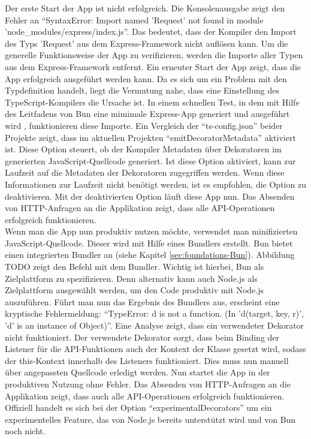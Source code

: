 \noindent
Der erste Start der App ist nicht erfolgreich. Die Konsolenausgabe zeigt den Fehler an ``SyntaxError: Import named 'Request' not found in module 'node\_modules/express/index.js''. Das bedeutet, dass der Kompiler den Import des Typs 'Request' aus dem Express-Framework nicht auflösen kann. Um die generelle Funktionsweise der App zu verifizieren, werden die Importe aller Typen aus dem Express-Framework entfernt. Ein erneuter Start der App zeigt, dass die App erfolgreich ausgeführt werden kann. Da es sich um ein Problem mit den Typdefinition handelt, liegt die Vermutung nahe, dass eine Einstellung des TypeScript-Kompilers  die Ursache ist. In einem schnellen Test, in dem mit Hilfe des Leitfadens von Bun eine mimimale Express-App generiert und ausgeführt wird , funktionieren diese Importe. Ein Vergleich der ``ts-config.json'' beider Projekte zeigt, dass im aktuellen Projekten ``emitDecoratorMetadata'' aktiviert ist. Diese Option steuert, ob der Kompiler Metadaten über Dekoratoren im generierten JavaScript-Quellcode generiert. Ist diese Option aktiviert, kann zur Laufzeit auf die Metadaten der Dekoratoren zugegriffen werden. Wenn diese Informationen zur Laufzeit nicht benötigt werden, ist es empfohlen, die Option zu deaktivieren. Mit der deaktivierten Option läuft diese App nun. Das Absenden von HTTP-Anfragen an die Applikation zeigt, dass alle API-Operationen erfolgreich funktionieren.\\

\noindent
Wenn man die App nun produktiv nutzen möchte, verwendet man minifizierten JavaScript-Quellcode. Dieser wird mit Hilfe eines Bundlers erstellt. Bun bietet einen integrierten Bundler an (siehe Kapitel \ref{sec:foundations-Bun}). Abbildung TODO zeigt den Befehl mit dem Bundler. Wichtig ist hierbei, Bun als Zielplattform zu spezifizieren. Denn alternativ kann auch Node.js als Zielplattform ausgewählt werden, um den Code produktiv mit Node.js auszuführen. Führt man nun das Ergebnis des Bundlers aus, erscheint eine kryptische Fehlermeldung: ``TypeError: d is not a function. (In 'd(target, key, r)', 'd' is an instance of Object)''. Eine Analyse zeigt, dass ein verwendeter Dekorator nicht funktioniert. Der verwendete Dekorator sorgt, dass beim Binding der Listener für die API-Funktionen auch der Kontext der Klasse gesetzt wird, sodass der this-Kontext innerhalb des Listeners funktioniert. Dies muss nun manuell über angepassten Quellcode erledigt werden. Nun startet die App in der produktiven Nutzung ohne Fehler. Das Absenden von HTTP-Anfragen an die Applikation zeigt, dass auch alle API-Operationen erfolgreich funktionieren. Offiziell handelt es sich bei der Option ``experimentalDecorators''  um ein experimentelles Feature, das von Node.js bereits unterstützt wird und von Bun noch nicht.

